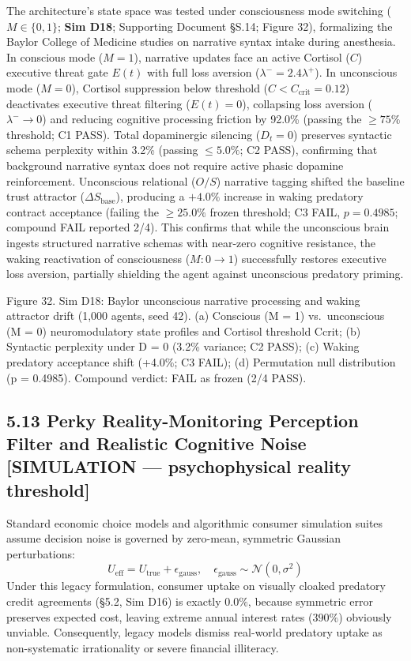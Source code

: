 \documentclass[
]{article}
\begin{document}
The architecture's state space was tested under consciousness mode
switching (\(M \in \{0, 1\}\); \textbf{Sim D18}; Supporting Document
§S.14; Figure 32), formalizing the Baylor College of Medicine studies on
narrative syntax intake during anesthesia. In conscious mode (\(M=1\)),
narrative updates face an active Cortisol (\(C\)) executive threat gate
\(E(t)\) with full loss aversion (\(\lambda^- = 2.4\lambda^+\)). In
unconscious mode (\(M=0\)), Cortisol suppression below threshold
(\(C < C_{\text{crit}} = 0.12\)) deactivates executive threat filtering
(\(E(t) = 0\)), collapsing loss aversion (\(\lambda^- \to 0\)) and
reducing cognitive processing friction by 92.0\% (passing the
\(\ge 75\%\) threshold; C1 PASS). Total dopaminergic silencing
(\(D_t = 0\)) preserves syntactic schema perplexity within 3.2\%
(passing \(\le 5.0\%\); C2 PASS), confirming that background narrative
syntax does not require active phasic dopamine reinforcement.
Unconscious relational (\(O/S\)) narrative tagging shifted the baseline
trust attractor (\(\Delta S_{\text{base}}\)), producing a \(+4.0\%\)
increase in waking predatory contract acceptance (failing the
\(\ge 25.0\%\) frozen threshold; C3 FAIL, \(p = 0.4985\); compound FAIL
reported 2/4). This confirms that while the unconscious brain ingests
structured narrative schemas with near-zero cognitive resistance, the
waking reactivation of consciousness (\(M: 0 \to 1\)) successfully
restores executive loss aversion, partially shielding the agent against
unconscious predatory priming.

Figure 32. Sim D18: Baylor unconscious narrative processing and waking
attractor drift (1,000 agents, seed 42). (a) Conscious ({M = 1})
vs.~unconscious ({M = 0}) neuromodulatory state profiles and Cortisol
threshold {Ccrit}; (b) Syntactic perplexity under {D = 0} (3.2\%
variance; C2 PASS); (c) Waking predatory acceptance shift (+4.0\%; C3
FAIL); (d) Permutation null distribution ({p = 0.4985}). Compound
verdict: FAIL as frozen (2/4 PASS).

\subsection{5.13 Perky Reality-Monitoring Perception Filter and
Realistic Cognitive Noise {[}SIMULATION --- psychophysical reality
threshold{]}}\label{perky-reality-monitoring-perception-filter-and-realistic-cognitive-noise-simulation-psychophysical-reality-threshold}

Standard economic choice models and algorithmic consumer simulation
suites assume decision noise is governed by zero-mean, symmetric
Gaussian perturbations: \[
U_{\text{eff}} = U_{\text{true}} + \epsilon_{\text{gauss}}, \quad \epsilon_{\text{gauss}} \sim \mathcal{N}(0, \sigma^2)
\] Under this legacy formulation, consumer uptake on visually cloaked
predatory credit agreements (§5.2, Sim D16) is exactly \(0.0\%\),
because symmetric error preserves expected cost, leaving extreme annual
interest rates (\(390\%\)) obviously unviable. Consequently, legacy
models dismiss real-world predatory uptake as non-systematic
irrationality or severe financial illiteracy.
\end{document}
